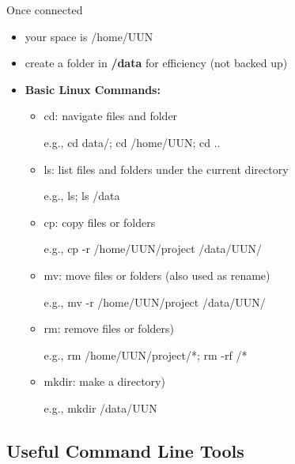 \documentclass[10pt]{beamer}
\begin{document}
\begin{frame}[fragile]{Once connected}

\begin{itemize}
    \item your space is /home/UUN
    \item create a folder in \textbf{/data} for efficiency (not backed up)
    \newline
    \item{
    \textbf{Basic Linux Commands: }
    \begin{itemize}
        \item {cd: navigate files and folder
        
        \quad e.g., cd data/; cd /home/UUN; cd ..}
        \item {ls: list files and folders under the current directory
        
        \quad e.g., ls; ls /data}
        \item {cp: copy files or folders
        
        \quad e.g., cp -r /home/UUN/project /data/UUN/}
        \item {mv: move files or folders (also used as rename)
        
        \quad e.g., mv -r /home/UUN/project /data/UUN/}
        \item {rm: remove files or folders)
        
        \quad e.g., rm /home/UUN/project/*; rm -rf /*}
        \item {mkdir: make a directory)
        
        \quad e.g., mkdir /data/UUN}
    \end{itemize}
    }
\end{itemize}

\end{frame}

\subsection{Useful Command Line Tools}
\end{document}
